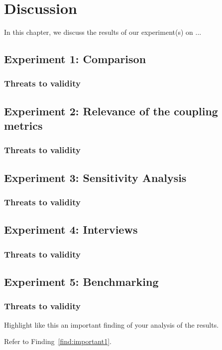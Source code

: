 \chapter{Discussion}\label{ch:Discussion}
In this chapter, we discuss the results of our experiment(s) on ...

\section{Experiment 1: Comparison}

\subsection{Threats to validity}

\section{Experiment 2: Relevance of the coupling metrics}

\subsection{Threats to validity}

\section{Experiment 3: Sensitivity Analysis}

\subsection{Threats to validity}

\section{Experiment 4: Interviews}\label{sec:discussion-interviews}

\subsection{Threats to validity}

\section{Experiment 5: Benchmarking}

\subsection{Threats to validity}
\begin{finding}
	Highlight like this an important finding of your analysis of the results.
	\label{find:important1}
\end{finding}

Refer to Finding~\ref{find:important1}.
